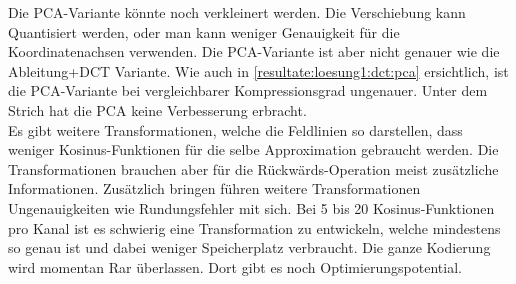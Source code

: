 Die PCA-Variante könnte noch verkleinert werden. Die Verschiebung kann Quantisiert werden, oder man kann weniger Genauigkeit für die Koordinatenachsen verwenden. Die PCA-Variante ist aber nicht genauer wie die Ableitung+DCT Variante. Wie auch in \ref{resultate:loesung1:dct:pca} ersichtlich, ist die PCA-Variante bei vergleichbarer Kompressionsgrad ungenauer. Unter dem Strich hat die PCA keine Verbesserung erbracht.\\
[\baselineskip]
Es gibt weitere Transformationen, welche die Feldlinien so darstellen, dass weniger Kosinus-Funktionen für die selbe Approximation gebraucht werden. Die Transformationen brauchen aber für die Rückwärds-Operation meist zusätzliche Informationen. Zusätzlich bringen führen weitere Transformationen Ungenauigkeiten wie Rundungsfehler mit sich. Bei 5 bis 20 Kosinus-Funktionen pro Kanal ist es schwierig eine Transformation zu entwickeln, welche mindestens so genau ist und dabei weniger Speicherplatz verbraucht. Die ganze Kodierung wird momentan Rar überlassen. Dort gibt es noch Optimierungspotential.

